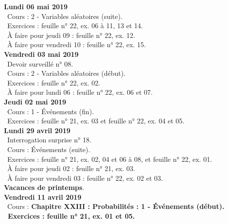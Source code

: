 \documentclass[12pt,a4paper]{article}
\begin{document}
\noindent\textbf{Lundi 06 mai 2019}\\
\bu\ Cours : 2 - Variables aléatoires (suite).\\
\bu\ Exercices : feuille n° 22, ex. 06 à 11, 13 et 14.\\
\bu\ À faire pour jeudi 09 : feuille n° 22, ex. 12.\\
\bu\ À faire pour vendredi 10 : feuille n° 22, ex. 15.\vspace{.4cm}\\

\noindent\textbf{Vendredi 03 mai 2019}\\
\bu\ Devoir surveillé n° 08.\\
\bu\ Cours : 2 - Variables aléatoires (début).\\
\bu\ Exercices : feuille n° 22, ex. 02.\\
\bu\ À faire pour lundi 06 : feuille n° 22, ex. 06 et 07.\vspace{.4cm}\\

\noindent\textbf{Jeudi 02 mai 2019}\\
\bu\ Cours : 1 - Événements (fin).\\
\bu\ Exercices : feuille n° 21, ex. 03 et feuille n° 22, ex. 04 et 05.\vspace{.4cm}\\

\noindent\textbf{Lundi 29 avril 2019}\\
\bu\ Interrogation surprise n° 18.\\
\bu\ Cours : Événements (suite).\\
\bu\ Exercices : feuille n° 21, ex. 02, 04 et 06 à 08, et feuille n° 22, ex. 01.\\
\bu\ À faire pour jeudi 02 : feuille n° 21, ex. 03.\\
\bu\ À faire pour vendredi 03 : feuille n° 22, ex. 02 et 03.\vspace{.4cm}\\

\noindent\textbf{\bf Vacances de printemps}.\vspace{.4cm}\\

\noindent\textbf{Vendredi 11 avril 2019}\\
\bu\ Cours : \bf Chapitre XXIII \rm : Probabilités : 1 - Événements (début).\\
\bu\ Exercices : feuille n° 21, ex. 01 et 05.\vspace{.4cm}\\
\end{document}
